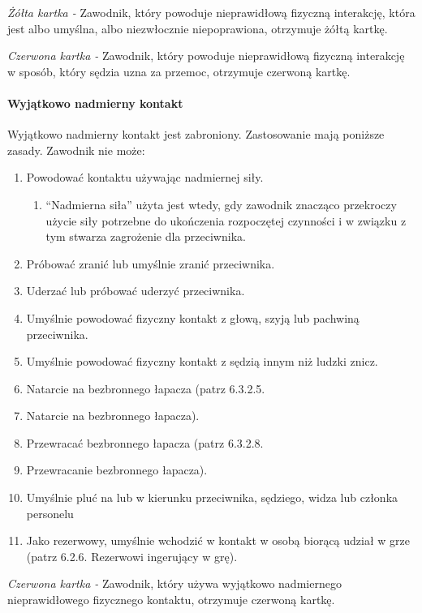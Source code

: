 \documentclass[12pt]{article}
\begin{document}
\emph{Żółta kartka -} Zawodnik, który powoduje nieprawidłową fizyczną
interakcję, która jest albo umyślna, albo niezwłocznie niepoprawiona,
otrzymuje żółtą kartkę.

\emph{Czerwona kartka -} Zawodnik, który powoduje nieprawidłową fizyczną
interakcję w sposób, który sędzia uzna za przemoc, otrzymuje czerwoną
kartkę.

\paragraph{Wyjątkowo nadmierny kontakt}
Wyjątkowo nadmierny
kontakt jest zabroniony. Zastosowanie mają poniższe zasady. Zawodnik nie
może:

\begin{enumerate}
	\item
	      Powodować kontaktu używając nadmiernej siły.

	      \begin{enumerate}
		      \item
		            ``Nadmierna siła'' użyta jest wtedy, gdy zawodnik znacząco
		            przekroczy użycie siły potrzebne do ukończenia rozpoczętej czynności
		            i w związku z tym stwarza zagrożenie dla przeciwnika.
	      \end{enumerate}
	\item
	      Próbować zranić lub umyślnie zranić przeciwnika.
	\item
	      Uderzać lub próbować uderzyć przeciwnika.
	\item
	      Umyślnie powodować fizyczny kontakt z głową, szyją lub pachwiną
	      przeciwnika.
	\item
	      Umyślnie powodować fizyczny kontakt z sędzią innym niż ludzki znicz.
	\item
	      Natarcie na bezbronnego łapacza (patrz 6.3.2.5.\item Natarcie na
	      bezbronnego łapacza).
	\item
	      Przewracać bezbronnego łapacza (patrz 6.3.2.8.\item Przewracanie
	      bezbronnego łapacza).
	\item
	      Umyślnie pluć na lub w kierunku przeciwnika, sędziego, widza lub
	      członka personelu
	\item
	      Jako rezerwowy, umyślnie wchodzić w kontakt w osobą biorącą udział w
	      grze (patrz 6.2.6. Rezerwowi ingerujący w grę).
\end{enumerate}

\emph{Czerwona kartka -} Zawodnik, który używa wyjątkowo nadmiernego
nieprawidłowego fizycznego kontaktu, otrzymuje czerwoną kartkę.
\end{document}
